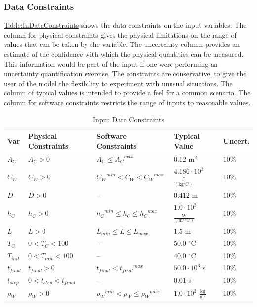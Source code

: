 \documentclass[12pt]{article}
\begin{document}
\subsubsection{Data Constraints}
\label{Sec:DataConstraints}
\hyperref[Table:InDataConstraints]{Table:InDataConstraints} shows the data constraints on the input variables. The column for physical constraints gives the physical limitations on the range of values that can be taken by the variable. The uncertainty column provides an estimate of the confidence with which the physical quantities can be measured. This information would be part of the input if one were performing an uncertainty quantification exercise. The constraints are conservative, to give the user of the model the flexibility to experiment with unusual situations. The column of typical values is intended to provide a feel for a common scenario. The column for software constraints restricts the range of inputs to reasonable values.

\begin{longtable}{l l l l l}
\toprule
\textbf{Var} & \textbf{Physical Constraints} & \textbf{Software Constraints} & \textbf{Typical Value} & \textbf{Uncert.}
\\
\midrule
\endhead
${A_{C}}$ & ${A_{C}}>0$ & ${A_{C}}\leq{}{{A_{C}}^{max}}$ & $0.12$ $\text{m}^{2}$ & 10$\%$
\\
${C_{W}}$ & ${C_{W}}>0$ & ${{C_{W}}^{min}}<{C_{W}}<{{C_{W}}^{max}}$ & $4.186\cdot{}10^{3}$ $\frac{\text{J}}{(\text{kg}{}^{\circ}\text{C})}$ & 10$\%$
\\
$D$ & $D>0$ & -- & $0.412$ m & 10$\%$
\\
${h_{C}}$ & ${h_{C}}>0$ & ${{h_{C}}^{min}}\leq{}{h_{C}}\leq{}{{h_{C}}^{max}}$ & $1.0\cdot{}10^{3}$ $\frac{\text{W}}{(\text{m}^{2}{}^{\circ}\text{C})}$ & 10$\%$
\\
$L$ & $L>0$ & ${L_{min}}\leq{}L\leq{}{L_{max}}$ & $1.5$ m & 10$\%$
\\
${T_{C}}$ & $0<{T_{C}}<100$ & -- & $50.0$ ${}^{\circ}$C & 10$\%$
\\
${T_{init}}$ & $0<{T_{init}}<100$ & -- & $40.0$ ${}^{\circ}$C & 10$\%$
\\
${t_{final}}$ & ${t_{final}}>0$ & ${t_{final}}<{{t_{final}}^{max}}$ & $50.0\cdot{}10^{3}$ s & 10$\%$
\\
${t_{step}}$ & $0<{t_{step}}<{t_{final}}$ & -- & $0.01$ s & 10$\%$
\\
${ρ_{W}}$ & ${ρ_{W}}>0$ & ${{ρ_{W}}^{min}}<{ρ_{W}}\leq{}{{ρ_{W}}^{max}}$ & $1.0\cdot{}10^{3}$ $\frac{\text{kg}}{\text{m}^{3}}$ & 10$\%$
\\
\bottomrule
\caption{Input Data Constraints}
\label{Table:InDataConstraints}
\end{longtable}
\end{document}
